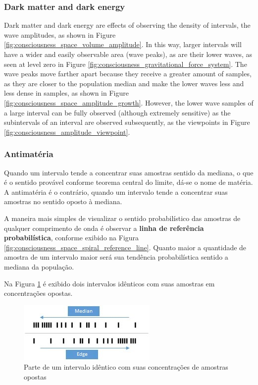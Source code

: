\subsubsection{Dark matter and dark energy}
Dark matter and dark energy are effects of observing the density of intervals, the wave amplitudes, as shown in Figure \ref{fig:consciousness_space_volume_amplitude}. In this way, larger intervals will have a wider and easily observable area (wave peaks), as are their lower waves, as seen at level zero in Figure \ref{fig:consciousness_gravitational_force_system}. The wave peaks move farther apart because they receive a greater amount of samples, as they are closer to the population median and make the lower waves less and less dense in samples, as shown in Figure \ref{fig:consciousness_space_amplitude_growth}. However, the lower wave samples of a large interval can be fully observed (although extremely sensitive) as the subintervals of an interval are observed subsequently, as the viewpoints in Figure \ref{fig:consciousness_amplitude_viewpoint}.

\subsubsection{Antimatéria}
Quando um intervalo tende a concentrar suas amostras sentido da mediana, o que é o sentido provável conforme teorema central do limite, dá-se o nome de matéria. A antimatéria é o contrário, quando um intervalo tende a concentrar suas amostras no sentido oposto à mediana. 

A maneira mais simples de visualizar o sentido probabilístico das amostras de qualquer comprimento de onda é observar a \textbf{linha de referência probabilística}, conforme exibido na Figura \ref{fig:consciousness_space_spiral_reference_line}. Quanto maior a quantidade de amostra de um intervalo maior será sua tendência probabilística sentido a mediana da população.

Na Figura \ref{fig:consciousness_concentration_of_opposite_samples} é exibido dois intervalos idênticos com suas amostras em concentrações opostas.
	\begin{figure}[H]
	\caption{Parte de um intervalo idêntico com suas concentrações de amostras opostas}
	\label{fig:consciousness_concentration_of_opposite_samples}
	\centering
	\includegraphics[scale=1.2]{sections/images/consciousness_concentration_of_opposite_samples.jpg}
	\end{figure}

